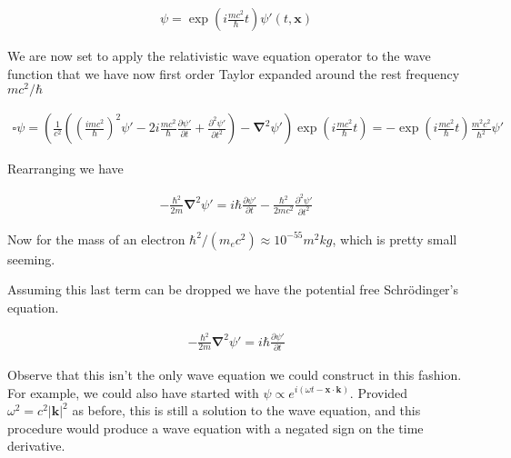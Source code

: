 \documentclass[]{eliblog}
\newcommand{\Abs}[1]{{\left\lvert{#1}\right\rvert}}
\newcommand{\Bk}[0]{\mathbf{k}}
\newcommand{\Bx}[0]{\mathbf{x}}
\newcommand{\spacegrad}[0]{\boldsymbol{\nabla}}
\newcommand{\delambertian}[0]{\square}
\begin{document}
\begin{align}
\psi = \exp\left( i \frac{m c^2}{\hbar} t \right) \psi'(t, \Bx)
\end{align}

We are now set to apply the relativistic wave equation operator to the wave function that we have now first order Taylor expanded
around the rest frequency $m c^2/\hbar$

\begin{align}
\delambertian \psi
=
\left(
\frac{1}{c^2}
\left(
\left( \frac{i m c^2}{\hbar} \right)^2 \psi' - 2 i \frac{m c^2}{\hbar} \frac{\partial \psi'}{\partial t} +
\frac{\partial^2 \psi'}{\partial t^2}
\right)
-
\spacegrad^2 \psi'
\right)
\exp\left( i \frac{m c^2}{\hbar} t \right)
= -
\exp\left( i \frac{m c^2}{\hbar} t \right)
\frac{m^2 c^2}{\hbar^2} \psi'
\end{align}

Rearranging we have

\begin{align}
-\frac{\hbar^2}{2m} \spacegrad^2 \psi' = i \hbar \frac{\partial \psi'}{\partial t} -\frac{\hbar^2}{2m c^2} \frac{\partial^2 \psi'}{\partial t^2}
\end{align}

Now for the mass of an electron $\hbar^2/(m_e c^2) \approx 10^{-55} m^2 kg$, which is pretty small seeming.

Assuming this last term can be dropped we have the potential free Schr\"{o}dinger's equation.

\begin{align}
-\frac{\hbar^2}{2m} \spacegrad^2 \psi' = i \hbar \frac{\partial \psi'}{\partial t}
\end{align}

Observe that
this isn't the only wave equation we could construct in this fashion.  For example, we could also have started with $\psi \propto e^{i(\omega t - \Bx \cdot \Bk)}$.  Provided $\omega^2 = c^2 \Abs{\Bk}^2$ as before, this is still a solution to the wave equation, and this procedure would produce a wave equation with a negated sign on the time derivative.



\end{document}

